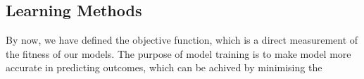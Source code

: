 \subsection {Learning Methods}
By now, we have defined the objective function, which is a direct measurement of the fitness of our models. The purpose of model training is to make model more accurate in predicting outcomes, which can be achived by minimising the 